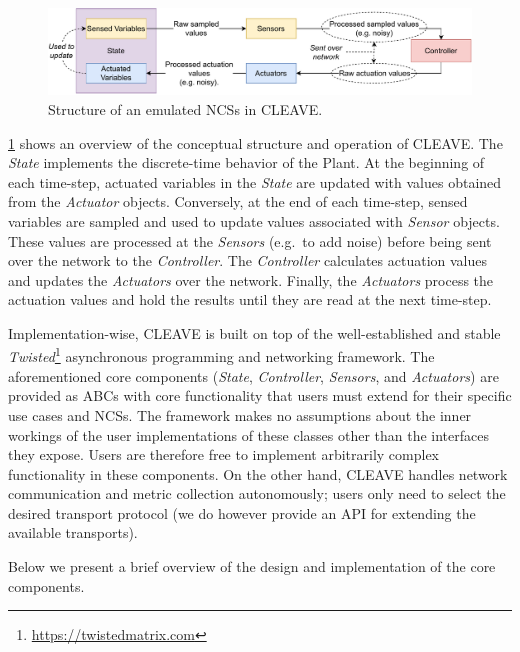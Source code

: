 \begin{figure}
    \centering
    \includegraphics[width=.8\textwidth]{publications/2022CLEAVE/images/CLEAVE_NCS_structure}
    \caption{
        Structure of an emulated \glspl{NCS} in \gls{CLEAVE}.
    }\label{paper:olguinmunoz2022cleave:fig:cleave:ncs:struct}
\end{figure}

\cref{paper:olguinmunoz2022cleave:fig:cleave:ncs:struct} shows an overview of the conceptual structure and operation of \gls{CLEAVE}.
The \emph{State} implements the discrete-time behavior of the Plant.
At the beginning of each time-step, actuated variables in the \emph{State} are updated with values obtained from the \emph{Actuator} objects.
Conversely, at the end of each time-step, sensed variables are sampled and used to update values associated with \emph{Sensor} objects.
These values are processed at the \emph{Sensors} (e.g.\ to add noise) before being sent over the network to the \emph{Controller}.
The \emph{Controller} calculates actuation values and updates the \emph{Actuators} over the network.
Finally, the \emph{Actuators} process the actuation values and hold the results until they are read at the next time-step.

Implementation-wise, \gls{CLEAVE} is built on top of the well-established and stable \emph{Twisted}\footnote{\url{https://twistedmatrix.com}} asynchronous programming and networking framework.
The aforementioned core components (\emph{State}, \emph{Controller}, \emph{Sensors}, and \emph{Actuators}) are provided as \glspl{ABC} with core functionality that users must extend for their specific use cases and \glspl{NCS}.
The framework makes no assumptions about the inner workings of the user implementations of these classes other than the interfaces they expose.
Users are therefore free to implement arbitrarily complex functionality in these components.
On the other hand, \gls{CLEAVE} handles network communication and metric collection autonomously; users only need to select the desired transport protocol (we do however provide an \gls{API} for extending the available transports).

Below we present a brief overview of the design and implementation of the core components.

